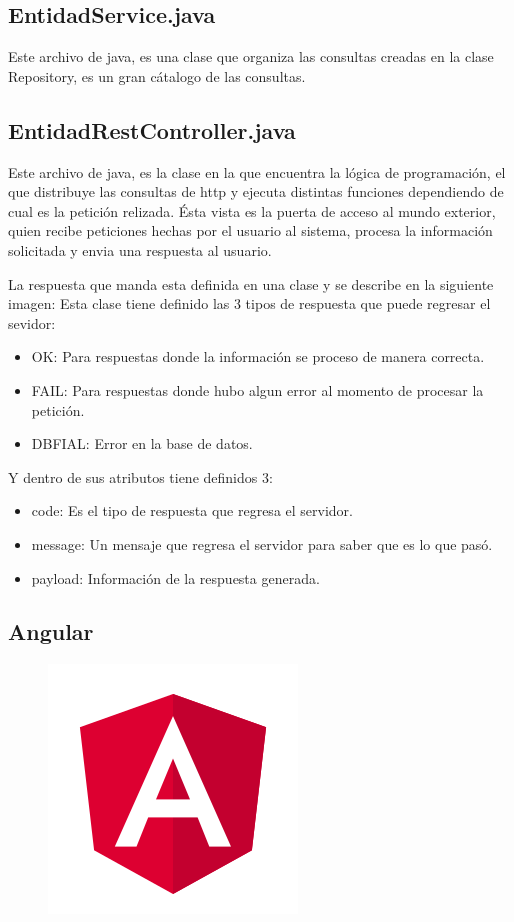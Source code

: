 \subsection{EntidadService.java}
Este archivo de java, es una clase que organiza las consultas creadas en la clase Repository, es un gran cátalogo de las consultas.
\subsection{EntidadRestController.java}
Este archivo de java, es la clase en la que encuentra la lógica de programación, el que distribuye las consultas de http y ejecuta distintas funciones dependiendo de cual es la petición relizada.
Ésta vista es la puerta de acceso al mundo exterior, quien recibe peticiones hechas por el usuario al sistema, procesa la información solicitada y envia una respuesta al usuario.

La respuesta que manda esta definida en una clase y se describe en la siguiente imagen:
Esta clase tiene definido las 3 tipos de respuesta que puede regresar el sevidor:
\begin{itemize}
    \item OK: Para respuestas donde la información se proceso de manera correcta.
    \item FAIL: Para respuestas donde hubo algun error al momento de procesar la petición.
    \item DBFIAL: Error en la base de datos.
\end{itemize}
Y dentro de sus atributos tiene definidos 3:
\begin{itemize}
    \item code: Es el tipo de respuesta que regresa el servidor.
    \item message: Un mensaje que regresa el servidor para saber que es lo que pasó.
    \item payload: Información de la respuesta generada.
\end{itemize}

\subsection{Angular}

\begin{figure}[H]
    \centering
    \includegraphics[width=0.3\linewidth]{images/tecnologias/angular.png}
\end{figure}

